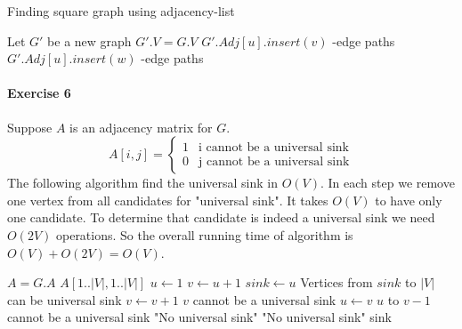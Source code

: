 \documentclass{book}
\begin{document}
	\begin{algorithm*}[h!]
		\caption{Finding square graph using adjacency-list}
		\begin{algorithmic}[1]
				\State Let $G'$	be a new graph
				\State $G'.V = G.V$
						\State $G'.Adj[u].insert(v)$ \label{MakeSquareGraph:1-path}
						-edge paths
						 \label{MakeSquareGraph:2-path:1}
							\State $G'.Adj[u].insert(w)$ \label{MakeSquareGraph:2-path:2}
							-edge paths
						\EndFor						
					\EndFor
				\EndFor
			\EndFunction
		\end{algorithmic}
	\end{algorithm*}
	\FloatBarrier
	\paragraph{Exercise 6}
	Suppose $A$ is an adjacency matrix for $G$.
	\begin{equation*}
		A[i, j] = \begin{cases}
		1 & \text{i cannot be a universal sink} \\
		0 & \text{j cannot be a universal sink}
		\end{cases}
	\end{equation*}
	The following algorithm find the universal sink in $O(V)$. In each step we remove one vertex from all candidates for "universal sink". It takes $O(V)$ to have only one candidate. To determine that candidate is indeed a universal sink we need $O(2V)$ operations. So the overall running time of algorithm is $O(V) + O(2V) = O(V)$.
	\begin{algorithm*}[h!]
		\begin{algorithmic}[1]
				\State $A = G.A$
				\Comment $A[1..|V|, 1..|V|]$
				\State $u \gets 1$								
					\State $v \gets u + 1$
					\State $sink \gets u$
					\Comment Vertices from $sink$ to $|V|$ can be universal sink					
						\State $v \gets v + 1$
						\Comment $v$ cannot be a universal sink
					\EndWhile
					\State $u \gets v$
					\Comment $u$ to $v - 1$ cannot be a universal sink
				\EndWhile
						\State \Return "No universal sink"
					\EndIf
				\EndFor
						\State \Return "No universal sink"
					\EndIf
				\EndFor
				\State \Return sink
			\EndFunction
		\end{algorithmic}
	\end{algorithm*}
	\FloatBarrier
\end{document}
